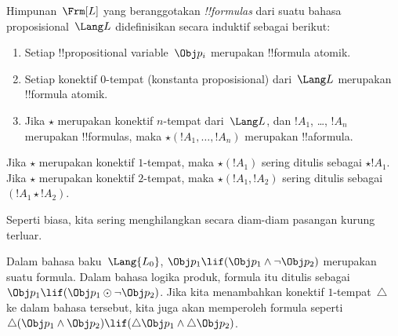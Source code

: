 \documentclass[../../../include/open-logic-section]{subfiles}
\begin{document}


\begin{defn}[Formula]
Himpunan~$\Frm[L]$ yang beranggotakan \emph{!!{formula}s} dari suatu bahasa
proposisional~$\Lang L$ didefinisikan secara induktif sebagai berikut:
\begin{enumerate}
\item Setiap !!{propositional variable}~$\Obj p_i$ merupakan !!{formula}
  atomik.
\item Setiap konektif $0$-tempat (konstanta proposisional) dari~$\Lang L$
  merupakan !!{formula} atomik.
\item Jika $\star$ merupakan konektif $n$-tempat dari~$\Lang L$, dan $!A_1$,
  \dots, $!A_n$ merupakan !!{formula}s, maka $\star(!A_1,\dots,!A_n)$
  merupakan !!a{formula}.
\end{enumerate}
Jika $\star$ merupakan konektif $1$-tempat, maka $\star(!A_1)$ sering ditulis
sebagai $\star !A_1$. Jika $\star$ merupakan konektif $2$-tempat, maka
$\star(!A_1,!A_2)$ sering ditulis sebagai $(!A_1\star !A_2)$.
\end{defn}

Seperti biasa, kita sering menghilangkan secara diam-diam pasangan kurung
terluar.

\begin{ex}
  Dalam bahasa baku~$\Lang{L_0}$, $\Obj p_1\lif(\Obj p_1\land\lnot\Obj p_2)$
  merupakan suatu formula. Dalam bahasa logika produk, formula itu ditulis
  sebagai $\Obj p_1\lif(\Obj p_1\odot\lnot\Obj p_2)$. Jika kita menambahkan
  konektif $1$-tempat~$\triangle$ ke dalam bahasa tersebut, kita juga akan
  memperoleh formula seperti $\triangle(\Obj p_1\land\Obj p_2)\lif
  (\triangle\Obj p_1\land\triangle\Obj p_2)$.
\end{ex}
\end{document}
